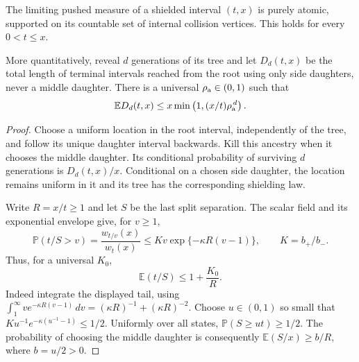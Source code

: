 \documentclass[11pt,letterpaper]{article}
\newcommand{\PP}{\mathbb P}\newcommand{\EE}{\mathbb E}
\begin{document}
\begin{lemma}
\label{lem:atomic-gap-mass}
The limiting pushed measure of a shielded interval $(t,x)$ is
purely atomic, supported on its countable set of internal collision
vertices. This holds for every $0<t\le x$.

More quantitatively, reveal $d$ generations of its tree and let
$D_d(t,x)$ be the total length of terminal intervals reached from
the root using only side daughters, never a middle daughter.
There is a universal $\rho_{\rm a}\in(0,1)$ such that
\begin{equation}\label{eq:side-mass-decay}
 \EE D_d(t,x)\le
 x\min\left(1,(x/t)\rho_{\rm a}^{\,d}\right).
\end{equation}
\end{lemma}
\begin{proof}
Choose a uniform location in the root interval, independently of
the tree, and follow its unique daughter interval backwards.
Kill this ancestry when it chooses the middle daughter.
Its conditional probability of surviving $d$ generations is
$D_d(t,x)/x$. Conditional on a chosen side daughter, the location
remains uniform in it and its tree has the corresponding shielding law.

Write $R=x/t\ge1$ and let $S$ be the last split separation.
The scalar field and its exponential envelope give, for $v\ge1$,
\[
 \PP(t/S>v)=\frac{w_{t/v}(x)}{w_t(x)}
 \le K v\exp\{-\kappa R(v-1)\},
 \qquad K=b_+/b_-.
\]
Thus, for a universal $K_0$,
\begin{equation}\label{eq:ancestry-ratio-bound}
 \EE(t/S)\le1+\frac{K_0}{R}.
\end{equation}
Indeed integrate the displayed tail, using
$\int_1^\infty v e^{-\kappa R(v-1)}\,dv
 =(\kappa R)^{-1}+(\kappa R)^{-2}$.
Choose $u\in(0,1)$ so small that
$K u^{-1}e^{-\kappa(u^{-1}-1)}\le1/2$.
Uniformly over all states, $\PP(S\ge ut)\ge1/2$.
The probability of choosing the middle daughter is consequently
$\EE(S/x)\ge b/R$, where $b=u/2>0$.


\end{proof}
\end{document}
